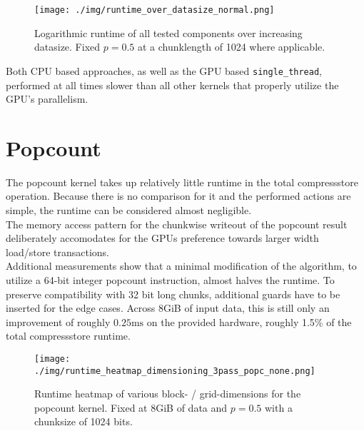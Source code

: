 \documentclass{tudscrreprt}
\begin{document}
		\begin{figure}[!ht]
			\centering
			\texttt{[image: ./img/runtime\_over\_datasize\_normal.png]}
			\caption{\label{fig:runtime_over_datasize_normal}Logarithmic runtime of all tested components over increasing datasize. Fixed $p=0.5$ at a chunklength of 1024 where applicable.}
		\end{figure}
	
		Both CPU based approaches, as well as the GPU based \texttt{single\_thread}, performed at all times slower than all other kernels that properly utilize the GPU's parallelism. \\
	
		\section{Popcount}
			\label{sec:evaluation_popcount}
			The popcount kernel takes up relatively little runtime in the total compressstore operation. Because there is no comparison for it and the performed actions are simple, the runtime can be considered almost negligible. \\
			The memory access pattern for the chunkwise writeout of the popcount result deliberately accomodates for the GPUs preference towards larger width load/store transactions. \\
			
			Additional measurements show that a minimal modification of the algorithm, to utilize a 64-bit integer popcount instruction, almost halves the runtime. To preserve compatibility with 32 bit long chunks, additional guards have to be inserted for the edge cases. Across 8GiB of input data, this is still only an improvement of roughly $0.25\text{ms}$ on the provided hardware, roughly 1.5\% of the total compressstore runtime. \\
			
			\begin{figure}[!ht]
				\centering
				\texttt{[image: ./img/runtime\_heatmap\_dimensioning\_3pass\_popc\_none.png]}
				\caption{\label{fig:runtime_heatmap_dimensioning_3pass_popc_none}Runtime heatmap of various block- / grid-dimensions for the popcount kernel. Fixed at 8GiB of data and $p=0.5$ with a chunksize of 1024 bits.}
			\end{figure}
			
\end{document}
